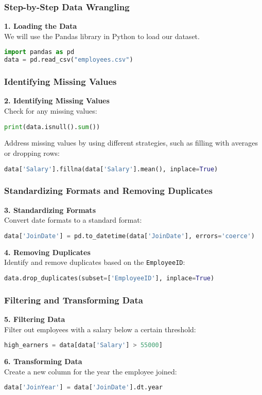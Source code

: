 \documentclass[aspectratio=169]{beamer}
\begin{document}
\begin{frame}[fragile]
    \frametitle{Step-by-Step Data Wrangling}
    \textbf{1. Loading the Data} \\
    We will use the Pandas library in Python to load our dataset.
    \begin{lstlisting}[language=Python]
import pandas as pd
data = pd.read_csv("employees.csv")
    \end{lstlisting}
\end{frame}

\begin{frame}[fragile]
    \frametitle{Identifying Missing Values}
    \textbf{2. Identifying Missing Values} \\
    Check for any missing values:
    \begin{lstlisting}[language=Python]
print(data.isnull().sum())
    \end{lstlisting}

    Address missing values by using different strategies, such as filling with averages or dropping rows:
    \begin{lstlisting}[language=Python]
data['Salary'].fillna(data['Salary'].mean(), inplace=True)
    \end{lstlisting}
\end{frame}

\begin{frame}[fragile]
    \frametitle{Standardizing Formats and Removing Duplicates}
    \textbf{3. Standardizing Formats} \\
    Convert date formats to a standard format:
    \begin{lstlisting}[language=Python]
data['JoinDate'] = pd.to_datetime(data['JoinDate'], errors='coerce')
    \end{lstlisting}

    \textbf{4. Removing Duplicates} \\
    Identify and remove duplicates based on the \texttt{EmployeeID}:
    \begin{lstlisting}[language=Python]
data.drop_duplicates(subset=['EmployeeID'], inplace=True)
    \end{lstlisting}
\end{frame}

\begin{frame}[fragile]
    \frametitle{Filtering and Transforming Data}
    \textbf{5. Filtering Data} \\
    Filter out employees with a salary below a certain threshold:
    \begin{lstlisting}[language=Python]
high_earners = data[data['Salary'] > 55000]
    \end{lstlisting}

    \textbf{6. Transforming Data} \\
    Create a new column for the year the employee joined:
    \begin{lstlisting}[language=Python]
data['JoinYear'] = data['JoinDate'].dt.year
    \end{lstlisting}
\end{frame}
\end{document}
